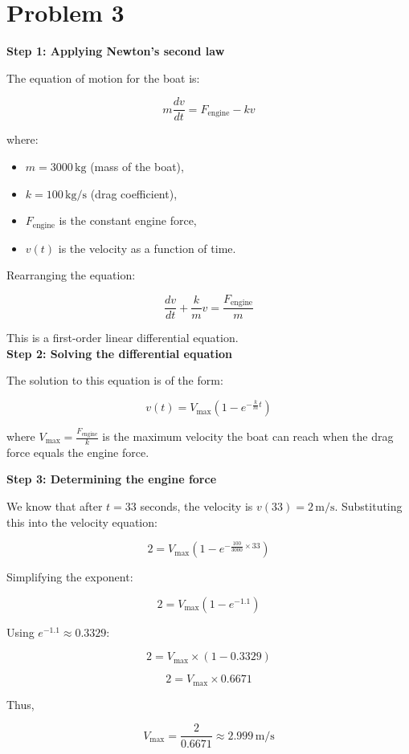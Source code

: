 \section{Problem 3}

\textbf{Step 1: Applying Newton's second law}

The equation of motion for the boat is:

\[
m \frac{dv}{dt} = F_{\text{engine}} - kv
\]

where:
\begin{itemize}
    \item $m = 3000 \, \text{kg}$ (mass of the boat),
    \item $k = 100 \, \text{kg/s}$ (drag coefficient),
    \item $F_{\text{engine}}$ is the constant engine force,
    \item $v(t)$ is the velocity as a function of time.
\end{itemize}

Rearranging the equation:

\[
\frac{dv}{dt} + \frac{k}{m}v = \frac{F_{\text{engine}}}{m}
\]

This is a first-order linear differential equation. \\

\textbf{Step 2: Solving the differential equation}

The solution to this equation is of the form:

\[
v(t) = V_{\text{max}} \left(1 - e^{-\frac{k}{m} t}\right)
\]

where $V_{\text{max}} = \frac{F_{\text{engine}}}{k}$ is the maximum velocity the boat can reach when the drag force equals the engine force.

\textbf{Step 3: Determining the engine force}

We know that after $t = 33$ seconds, the velocity is $v(33) = 2 \, \text{m/s}$. Substituting this into the velocity equation:

\[
2 = V_{\text{max}} \left(1 - e^{-\frac{100}{3000} \times 33}\right)
\]

Simplifying the exponent:

\[
2 = V_{\text{max}} \left(1 - e^{-1.1}\right)
\]

Using $e^{-1.1} \approx 0.3329$:

\[
2 = V_{\text{max}} \times (1 - 0.3329)
\]

\[
2 = V_{\text{max}} \times 0.6671
\]

Thus,

\[
V_{\text{max}} = \frac{2}{0.6671} \approx \boxed{2.999 \, \text{m/s}}
\]
